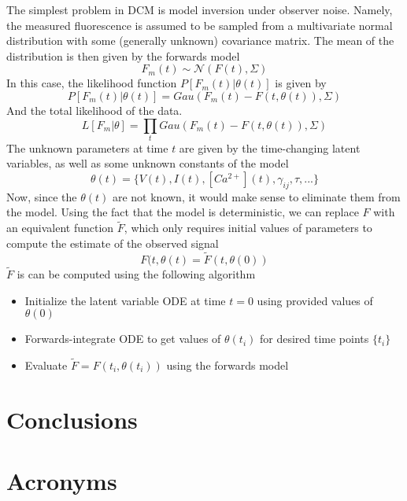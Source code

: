 \documentclass[a4paper,10pt]{article}
\begin{document}
The simplest problem in DCM is model inversion under observer noise. Namely, the measured fluorescence is assumed to be sampled from a multivariate normal distribution with some (generally unknown) covariance matrix. The mean of the distribution is then given by the forwards model
\begin{equation}
   F_m(t) \sim \mathcal{N}(F(t), \Sigma)
\end{equation}
In this case, the likelihood function $P[F_m(t) | \theta(t)]$ is given by
\begin{equation}
   P[F_m(t) | \theta(t)] = Gau(F_m(t) - F(t, \theta(t)), \Sigma)
\end{equation}
And the total likelihood of the data.
\begin{equation}
   L[F_m | \theta] = \prod_t Gau(F_m(t) - F(t, \theta(t)), \Sigma)
\end{equation}
The unknown parameters at time $t$ are given by the time-changing latent variables, as well as some unknown constants of the model
\begin{equation}
   \theta(t) = \{V(t), I(t), [Ca^{2+}](t), \gamma_{ij}, \tau, ...\}
\end{equation}
Now, since the $\theta(t)$ are not known, it would make sense to eliminate them from the model. Using the fact that the model is deterministic, we can replace $F$ with an equivalent function $\tilde{F}$, which only requires initial values of parameters to compute the estimate of the observed signal
\begin{equation}
   F(t, \theta(t) = \tilde{F}(t, \theta(0))
\end{equation}
$\tilde{F}$ is can be computed using the following algorithm
\begin{itemize}
  \item Initialize the latent variable ODE at time $t=0$ using provided values of $\theta(0)$
  \item Forwards-integrate ODE to get values of $\theta(t_i)$ for desired time points $\{t_i\}$
  \item Evaluate $\tilde{F} = F(t_i, \theta(t_i))$ using the forwards model 
\end{itemize}




\section{Conclusions}

\section{Acronyms}
\end{document}
